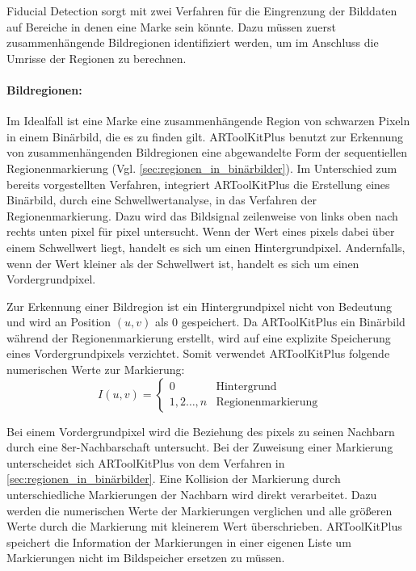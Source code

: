 Fiducial Detection sorgt mit zwei Verfahren für die Eingrenzung der Bilddaten auf Bereiche in denen eine Marke sein
 könnte. Dazu müssen zuerst zusammenhängende Bildregionen identifiziert werden, um im Anschluss die Umrisse der
 Regionen zu berechnen.

\paragraph{Bildregionen:} %
\label{par:bildregionen}
Im Idealfall ist eine Marke eine zusammenhängende Region von schwarzen Pixeln in einem Binärbild, die es zu finden
 gilt. ARToolKitPlus benutzt zur Erkennung von zusammenhängenden Bildregionen eine abgewandelte Form der sequentiellen
 Regionenmarkierung (Vgl. \autoref{sec:regionen_in_binärbilder}). Im Unterschied zum bereits vorgestellten Verfahren,
 integriert ARToolKitPlus die Erstellung eines Binärbild, durch eine Schwellwertanalyse, in das Verfahren der
 Regionenmarkierung. Dazu wird das Bildsignal zeilenweise von links oben nach rechts unten \gls{pixel} für \gls{pixel}
 untersucht. Wenn der Wert eines \glspl{pixel} dabei über einem Schwellwert liegt, handelt es sich um einen
 Hintergrundpixel. Andernfalls, wenn der Wert kleiner als der Schwellwert ist, handelt es sich um einen
 Vordergrundpixel.

Zur Erkennung einer Bildregion ist ein Hintergrundpixel nicht von Bedeutung und wird an Position $(u,v)$ als $0$
 gespeichert. Da ARToolKitPlus ein Binärbild während der Regionenmarkierung erstellt, wird auf eine explizite
 Speicherung eines Vordergrundpixels verzichtet. Somit verwendet ARToolKitPlus folgende numerischen Werte zur
 Markierung:
\begin{equation*}
	I(u,v) = \begin{cases}
	0 & \textrm{Hintergrund}\\
	1,2\ldots,n & \textrm{Regionenmarkierung}
	\end{cases}
\end{equation*}

Bei einem Vordergrundpixel wird die Beziehung des \glspl{pixel} zu seinen Nachbarn durch eine 8er-Nachbarschaft
 untersucht. Bei der Zuweisung einer Markierung unterscheidet sich ARToolKitPlus von dem Verfahren in
 \autoref{sec:regionen_in_binärbilder}. Eine Kollision der Markierung durch unterschiedliche Markierungen der Nachbarn
 wird direkt verarbeitet. Dazu werden die numerischen Werte der Markierungen verglichen und alle größeren Werte durch
 die Markierung mit kleinerem Wert überschrieben. ARToolKitPlus speichert die Information der Markierungen in einer
 eigenen Liste um Markierungen nicht im Bildspeicher ersetzen zu müssen.

